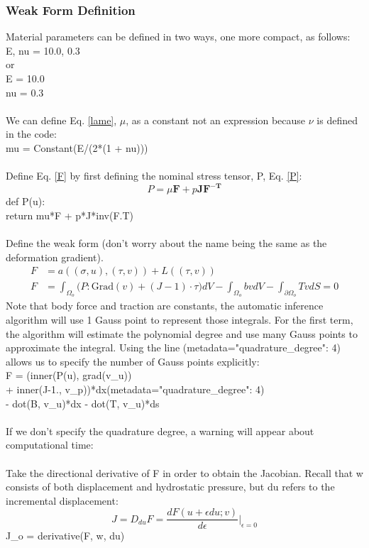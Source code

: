 \documentclass[12pt,3p]{article}
\begin{document}
\subsubsection{Weak Form Definition}
Material parameters can be defined in two ways, one more compact,  as follows: \\
{\selectfont
E, nu = 10.0, 0.3 \\ 
}
or \\
{\selectfont
E = 10.0 \\ 
nu = 0.3 \\ \\
}
We can define Eq. \ref{lame}, $\mu$, as a constant not an expression because $\nu$ is defined in the code: \\
{\selectfont
mu = Constant(E/(2*(1 + nu))) \\ \\ 
}
Define Eq. \ref{F} by first defining the nominal stress tensor, P, Eq. \ref{P}:
\begin{equation*}
P = \mu \mathbf{F} + p \mathbf{J} \mathbf{F^{-T}}
\end{equation*}
{\selectfont
def P(u): \\
\indent return mu*F + p*J*inv(F.T) \\ \\
}
Define the weak form (don't worry about the name being the same as the deformation gradient). 
\begin{align*}
F &= a((\sigma,u),(\tau, v)) + L((\tau, v)) \\
F &= \int_{\Omega_o} \big( P : \text{Grad}(v) + (J-1) \cdot \tau \big) dV - \int_{\Omega_o} b v dV - \int_{\partial \Omega_o} T v dS = 0 
\end{align*}
Note that body force and traction are constants, the automatic inference algorithm will use 1 Gauss point to represent those integrals. For the first term, the algorithm will estimate the polynomial degree and use many Gauss points to approximate the integral. Using the line {\selectfont (metadata={"quadrature\_degree": 4})} allows us to specify the number of Gauss points explicitly: \\
{\selectfont
F = (inner(P(u), grad(v\_u)) \\
\indent \indent + inner(J-1., v\_p))*dx(metadata={"quadrature\_degree": 4}) \\
\indent \indent - dot(B, v\_u)*dx - dot(T, v\_u)*ds \\ \\
}
If we don't specify the quadrature degree, a warning will appear about computational time: \\ \\ 
Take the directional derivative of F in order to obtain the Jacobian. Recall that w consists of both displacement and hydrostatic pressure, but du refers to the incremental displacement:
\begin{equation}
J = D_{du}F = \frac{dF (u + \epsilon du ; v )}{d \epsilon} \Bigr\rvert_{\epsilon = 0}
\end{equation}
{\selectfont
J\_o = derivative(F, w, du)
}
\end{document}
